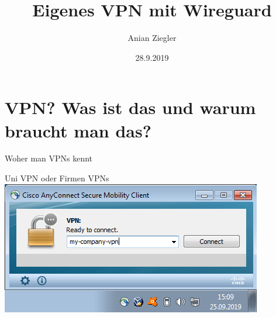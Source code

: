 \documentclass{beamer}
\title{Eigenes VPN mit Wireguard}
\date{28.9.2019}
\author{Anian Ziegler}
\institute{Hackerkiste 2019}
\begin{document}
  \maketitle

  \section{VPN? Was ist das und warum braucht man das?}

  \begin{frame}{Woher man VPNs kennt}
    \begin{center}
      Uni VPN oder Firmen VPNs \\
      \vspace{10pt}
      \includegraphics[width=\textwidth]{any-connect}
    \end{center}
  \end{frame}
\end{document}
